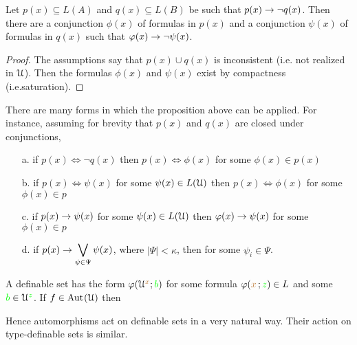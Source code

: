 \begin{proposition}\label{prop_normality}
Let $p(x)\subseteq L(A)$ and $q(x)\subseteq L(B)$ be such that $p(x)\rightarrow \neg q(x)$.
Then there are a conjunction $\phi(x)$ of formulas in $p(x)$ and a conjunction $\psi(x)$ of formulas in $q(x)$ such that $\varphi(x)\rightarrow\neg\psi(x)$.
\end{proposition}

\begin{proof}
The assumptions say that $p(x)\cup q(x)$ is inconsistent (i.e. not realized in $\EuScript U$). Then the formulas $\phi(x)$ and $\psi(x)$ exist by compactness (i.e.\@ saturation).
\end{proof}

\begin{remark}\label{rem_normality}There are many forms in which the proposition above can be applied. For instance, assuming for brevity that $p(x)$ and $q(x)$ are closed under conjunctions,
\begin{itemize}
\item[a.] if $p(x)\iff\neg q(x)$ then $p(x)\iff\phi(x)$ for some $\phi(x)\in p(x)$\smallskip
\item[b.] if $\displaystyle p(x)\iff\psi(x)$ for some $\psi(x)\in L(\EuScript U)$ then $p(x)\iff\phi(x)$ for some $\phi(x)\in p$\smallskip
\item[c.] if $\displaystyle p(x)\rightarrow\psi(x)$ for some $\psi(x)\in L(\EuScript U)$ then $\varphi(x)\rightarrow\psi(x)$ for some $\phi(x)\in p$\smallskip
\item[d.] if $\displaystyle p(x)\rightarrow\bigvee_{\psi\in\Psi}\psi(x)$, where $|\Psi|<\kappa$,  then  for some $\psi_i\in\Psi$.
\end{itemize}
\end{remark}

\begin{remark}\label{rem_image_def_set}
  A definable set has the form $\varphi(\EuScript U^{\color{brown} x};{\color{green} b})$ for some formula $\varphi({\color{brown} x}\,;{\color{green} z})\in L$ and some ${\color{green} b}\in\EuScript U^{\color{green} z}$.
  If $f\in{\rm Aut\kern.15ex}(\EuScript U)$ then 




  Hence automorphisms act on definable sets in a very natural way. 
  Their action on type-definable sets is similar.
\end{remark}

